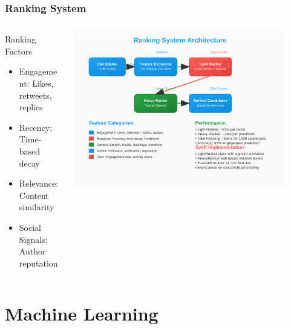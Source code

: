 \documentclass[aspectratio=169]{beamer}
\begin{document}
\begin{frame}
    \frametitle{Ranking System}
    \begin{columns}
        \begin{column}{0.5\textwidth}
            \begin{block}{Ranking Factors}
                \begin{itemize}
                    \item Engagement: Likes, retweets, replies
                    \item Recency: Time-based decay
                    \item Relevance: Content similarity
                    \item Social Signals: Author reputation
                \end{itemize}
            \end{block}
        \end{column}
        \begin{column}{0.5\textwidth}
            \begin{center}
                \includegraphics[width=0.9\textwidth]{images/ranking-system.svg}
            \end{center}
        \end{column}
    \end{columns}
\end{frame}

\section{Machine Learning}
\end{document}
